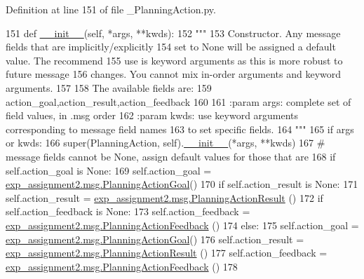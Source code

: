 Definition at line 151 of file \+\_\+\+Planning\+Action.\+py.


\begin{DoxyCode}
151   \textcolor{keyword}{def }\hyperlink{classstate__machine_1_1Play_a5993a23d8be7f7b2647f71ede0334957}{\_\_init\_\_}(self, *args, **kwds):
152     \textcolor{stringliteral}{"""}
153 \textcolor{stringliteral}{    Constructor. Any message fields that are implicitly/explicitly}
154 \textcolor{stringliteral}{    set to None will be assigned a default value. The recommend}
155 \textcolor{stringliteral}{    use is keyword arguments as this is more robust to future message}
156 \textcolor{stringliteral}{    changes.  You cannot mix in-order arguments and keyword arguments.}
157 \textcolor{stringliteral}{}
158 \textcolor{stringliteral}{    The available fields are:}
159 \textcolor{stringliteral}{       action\_goal,action\_result,action\_feedback}
160 \textcolor{stringliteral}{}
161 \textcolor{stringliteral}{    :param args: complete set of field values, in .msg order}
162 \textcolor{stringliteral}{    :param kwds: use keyword arguments corresponding to message field names}
163 \textcolor{stringliteral}{    to set specific fields.}
164 \textcolor{stringliteral}{    """}
165     \textcolor{keywordflow}{if} args \textcolor{keywordflow}{or} kwds:
166       super(PlanningAction, self).\hyperlink{classstate__machine_1_1Play_a5993a23d8be7f7b2647f71ede0334957}{\_\_init\_\_}(*args, **kwds)
167       \textcolor{comment}{# message fields cannot be None, assign default values for those that are}
168       \textcolor{keywordflow}{if} self.action\_goal \textcolor{keywordflow}{is} \textcolor{keywordtype}{None}:
169         self.action\_goal = \hyperlink{classexp__assignment2_1_1msg_1_1__PlanningActionGoal_1_1PlanningActionGoal}{exp\_assignment2.msg.PlanningActionGoal}()
170       \textcolor{keywordflow}{if} self.action\_result \textcolor{keywordflow}{is} \textcolor{keywordtype}{None}:
171         self.action\_result = \hyperlink{classexp__assignment2_1_1msg_1_1__PlanningActionResult_1_1PlanningActionResult}{exp\_assignment2.msg.PlanningActionResult}
      ()
172       \textcolor{keywordflow}{if} self.action\_feedback \textcolor{keywordflow}{is} \textcolor{keywordtype}{None}:
173         self.action\_feedback = \hyperlink{classexp__assignment2_1_1msg_1_1__PlanningActionFeedback_1_1PlanningActionFeedback}{exp\_assignment2.msg.PlanningActionFeedback}
      ()
174     \textcolor{keywordflow}{else}:
175       self.action\_goal = \hyperlink{classexp__assignment2_1_1msg_1_1__PlanningActionGoal_1_1PlanningActionGoal}{exp\_assignment2.msg.PlanningActionGoal}()
176       self.action\_result = \hyperlink{classexp__assignment2_1_1msg_1_1__PlanningActionResult_1_1PlanningActionResult}{exp\_assignment2.msg.PlanningActionResult}
      ()
177       self.action\_feedback = \hyperlink{classexp__assignment2_1_1msg_1_1__PlanningActionFeedback_1_1PlanningActionFeedback}{exp\_assignment2.msg.PlanningActionFeedback}
      ()
178 
\end{DoxyCode}


